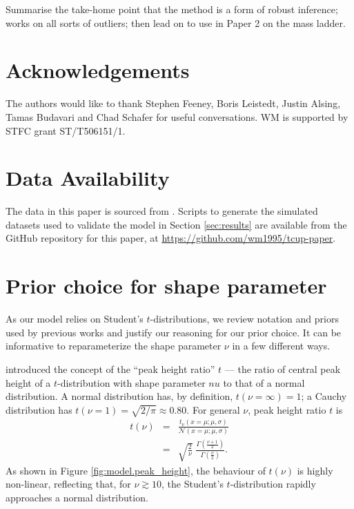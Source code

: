 \documentclass[fleqn,usenatbib]{rasti}
\newcommand{\studentt}[2]{t_\nu \left( #1, #2 \right)}
\begin{document}
{\color{red} Summarise the take-home point that the method is a form of robust inference;
works on all sorts of outliers; then lead on to use in Paper 2 on the mass
ladder.}

\section*{Acknowledgements}

The authors would like to thank Stephen Feeney, Boris Leistedt, Justin Alsing,
Tamas Budavari and Chad Schafer for useful conversations. WM is supported by
STFC grant ST/T506151/1.

\section*{Data Availability}

The data in this paper is sourced from \citet{Kelly:2007, Park:2017}. Scripts to
generate the simulated datasets used to validate the model in Section
\ref{sec:results} are available from the GitHub repository for this paper, at
\url{https://github.com/wm1995/tcup-paper}.







\appendix

\section{Prior choice for shape parameter}
\label{sec:t-prior}

As our model relies on Student's $t$-distributions, we review notation and
priors used by previous works and justify our reasoning for our prior choice. It
can be informative to reparameterize the shape parameter $\nu$ in a few
different ways.

\citet{Feeney:2018} introduced the concept of the ``peak height ratio'' $t$ ---
the ratio of central peak height of a $t$-distribution with shape parameter $nu$
to that of a normal distribution. A normal distribution has, by definition,
$t(\nu = \infty) = 1$; a Cauchy distribution has $t(\nu = 1) = \sqrt{2/\pi}
\approx 0.80$. For general $\nu$, peak height ratio $t$ is
\begin{eqnarray}
    t(\nu) &=& \frac{
        \studentt{x = \mu; \mu}{\sigma}
    }{
        \mathcal N \left(x = \mu; \mu, \sigma \right)
    } \\
    &=& \sqrt{\frac{2}{\nu}} \;
    \frac{
        \Gamma\left(\frac{\nu + 1}{2}\right)
    }{
        \Gamma\left(\frac{\nu}{2}\right)
    }.
\end{eqnarray}
As shown in Figure \ref{fig:model.peak_height}, the behaviour of $t(\nu)$ is
highly non-linear, reflecting that, for $\nu \gtrsim 10$, the Student's
$t$-distribution rapidly approaches a normal distribution.
\end{document}
